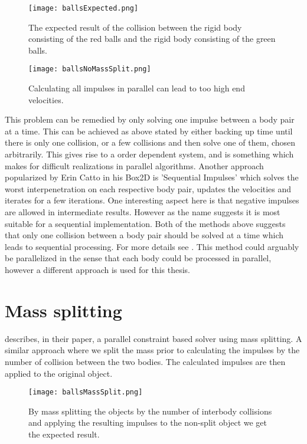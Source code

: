 \begin{figure}[H]
  \centering
  \texttt{[image: ballsExpected.png]}
  \caption{The expected result of the collision between the rigid body consisting
  of the red balls and the rigid body consisting of the green balls.}
  \label{fig:ballsExpected}
\end{figure}

\begin{figure}[H]
  \centering
  \texttt{[image: ballsNoMassSplit.png]}
  \caption{Calculating all impulses in parallel can lead to too high end velocities.}
  \label{fig:noSplit}
\end{figure}

This problem can be remedied by only solving one impulse between a body pair at a time.
This can be achieved as above stated by either backing up time until there
is only one collision, or a few collisions and then solve one of them, chosen
arbitrarily. This gives rise to a order dependent system, and is something which
makes for difficult realizations in parallel algorithms. Another approach popularized
by Erin Catto in his Box2D is 'Sequential Impulses' which solves the worst interpenetration
on each respective body pair, updates the velocities and iterates for a few iterations.
One interesting aspect here is that negative impulses are allowed in intermediate
results. However as the name suggests it is most suitable for a sequential implementation.
Both of the methods above suggests that only one collision between a body pair should
be solved at a time which leads to sequential processing. For more details see \cite{catto}.
This method could arguably be parallelized in the sense that each body could be
processed in parallel, however a different approach is used for this thesis.

\section{Mass splitting}\label{sec:massSplit}
\cite{tonge} describes, in their paper, a parallel constraint based solver
using mass splitting. A similar approach where we split the mass prior to
calculating the impulses by the number of collision between the two bodies. The
calculated impulses are then applied to the original object.

\begin{figure}[H]
  \centering
  \texttt{[image: ballsMassSplit.png]}
  \caption{By mass splitting the objects by the number of interbody collisions
  and applying the resulting impulses to the non-split object we get the expected result.}
  \label{fig:massSplit}
\end{figure}

